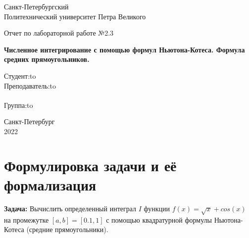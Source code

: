 \documentclass[12pt]{article}
\begin{document}
\begin{titlepage}
\Large

\begin{center}
Санкт-Петербургский \\ Политехнический университет Петра Великого

\vspace{10em}

Отчет по лабораторной работе №2.3\\

\vspace{2em}

\textbf{Численное интегрирование с помощью формул
Ньютона-Котеса. Формула средних прямоугольников.}
\end{center}

\vspace{6em}

\newbox{\lbox}
\newlength{\maxl}
\setlength{\maxl}{\wd\lbox}
\hfill\parbox{14cm}{
\hspace*{5cm}\hspace*{-5cm}Студент:\hfill\hbox to\\
\hspace*{5cm}\hspace*{-5cm}Преподаватель:\hfill\hbox to\\
\\
\hspace*{5cm}\hspace*{-5cm}Группа:\hfill\hbox to\\}

\vspace{\fill}
\begin{center}
Санкт-Петербург \\2022
\end{center}
\end{titlepage}
\section{Формулировка задачи и её формализация}
\textbf{Задача:} Вычислить определенный интеграл $I$ функции $f(x) = \sqrt{x} + cos(x)$ на промежутке $[a, b] = [0.1,1]$ с помощью квадратурной формулы Ньютона-Котеса (средние прямоугольники).
\end{document}
